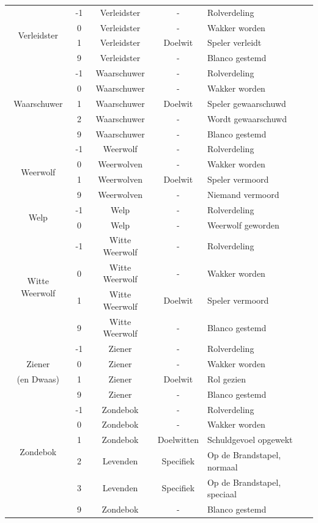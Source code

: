 \documentclass[12pt]{article}
\begin{document}
\begin{center}
\begin{longtable}{c|c|c|c|l}
      \hline
      \multirow{4}{*}{Verleidster} & -1 & Verleidster & - & Rolverdeling \\
       & 0 & Verleidster & - & Wakker worden \\
       & 1 & Verleidster & Doelwit & Speler verleidt \\
       & 9 & Verleidster & - & Blanco gestemd \\
      \hline
      \multirow{5}{*}{Waarschuwer} & -1 & Waarschuwer & - & Rolverdeling \\
       & 0 & Waarschuwer & - & Wakker worden \\
       & 1 & Waarschuwer & Doelwit & Speler gewaarschuwd \\
       & 2 & Waarschuwer & - & Wordt gewaarschuwd \\
       & 9 & Waarschuwer & - & Blanco gestemd \\
      \hline
      \multirow{4}{*}{Weerwolf} & -1 & Weerwolf & - & Rolverdeling \\
       & 0 & Weerwolven & - & Wakker worden \\
       & 1 & Weerwolven & Doelwit & Speler vermoord \\
       & 9 & Weerwolven & - & Niemand vermoord \\
      \hline
      \multirow{2}{*}{Welp} & -1 & Welp & - & Rolverdeling \\
       & 0 & Welp & - & Weerwolf geworden \\
      \hline
      \multirow{4}{*}{Witte Weerwolf} & -1 & Witte Weerwolf & - & Rolverdeling \\
       & 0 & Witte Weerwolf & - & Wakker worden \\
       & 1 & Witte Weerwolf & Doelwit & Speler vermoord \\
       & 9 & Witte Weerwolf & - & Blanco gestemd \\
      \hline
       & -1 & Ziener & - & Rolverdeling \\
      Ziener & 0 & Ziener & - & Wakker worden \\
      (en Dwaas) & 1 & Ziener & Doelwit & Rol gezien \\
       & 9 & Ziener & - & Blanco gestemd \\
      \hline
      \multirow{5}{*}{Zondebok} & -1 & Zondebok & - & Rolverdeling \\
       & 0 & Zondebok & - & Wakker worden \\
       & 1 & Zondebok & Doelwitten & Schuldgevoel opgewekt \\
       & 2 & Levenden & Specifiek & Op de Brandstapel, normaal \\
       & 3 & Levenden & Specifiek & Op de Brandstapel, speciaal \\
       & 9 & Zondebok & - & Blanco gestemd \\
    \end{longtable}
  \end{center}
\end{document}
